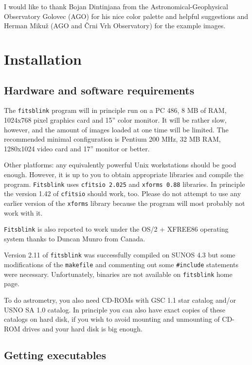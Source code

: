 \documentclass[11pt]{article}
\begin{document}
I would like to thank Bojan Dintinjana from the
Astronomical-Geophysical Observatory Golovec (AGO) for his nice color
palette and helpful suggestions and Herman Miku\v{z} (AGO and \v{C}rni
Vrh Observatory) for the example images.

\section{Installation}

\subsection{Hardware and software requirements}

The \verb=fitsblink= program will in principle run on a PC 486, 8 MB
of RAM, 1024x768 pixel graphics card and 15'' color monitor.  It will
be rather slow, however, and the amount of images loaded at one time
will be limited.  The recommended minimal configuration is Pentium 200
MHz, 32 MB RAM, 1280x1024 video card and 17'' monitor or better.

Other platforms: any equivalently powerful Unix workstations should be
good enough.  However, it is up to you to obtain appropriate libraries
and compile the program.  \verb=Fitsblink= uses \verb=cfitsio 2.025=
and \verb=xforms 0.88= libraries.  In principle the version 1.42 of
\verb=cfitsio= should work, too.  Please do not attempt to use any
earlier version of the \verb=xforms= library because the program will
most probably not work with it.  

\verb=Fitsblink= is also reported to work under the OS/2 + XFREE86
operating system thanks to Duncan Munro from Canada.

Version 2.11 of \verb=fitsblink= was successfully compiled on
SUNOS 4.3 but some modifications of the \verb=makefile= and commenting
out some \verb=#include= statements were necessary.  Unfortunately,
binaries are not available on \verb=fitsblink= home page. 

To do astrometry, you also need CD-ROMs with GSC 1.1 star catalog
and/or USNO SA 1.0 catalog.  In principle you can also have exact
copies of these catalogs on hard disk, if you wish to avoid mounting
and unmounting of CD-ROM drives and your hard disk is big enough.


\subsection{Getting executables}
\end{document}

